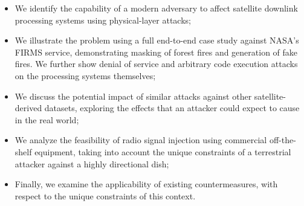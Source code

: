 \begin{itemize}
    \item We identify the capability of a modern adversary to affect satellite downlink processing systems using physical-layer attacks;
    \item We illustrate the problem using a full end-to-end case study against NASA's FIRMS service, demonstrating masking of forest fires and generation of fake fires. We further show denial of service and arbitrary code execution attacks on the processing systems themselves;
    \item We discuss the potential impact of similar attacks against other satellite-derived datasets, exploring the effects that an attacker could expect to cause in the real world;
    \item We analyze the feasibility of radio signal injection using commercial off-the-shelf equipment, taking into account the unique constraints of a terrestrial attacker against a highly directional dish;
    \item Finally, we examine the applicability of existing countermeasures, with respect to the unique constraints of this context.
\end{itemize}







